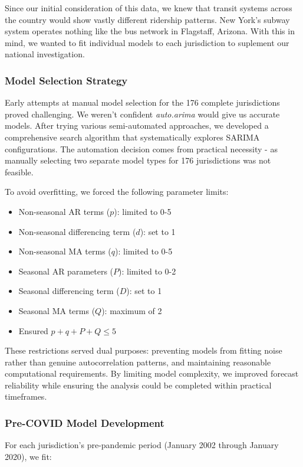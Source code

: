 \documentclass[11pt]{article}
\begin{document}
    Since our initial consideration of this data, we knew that transit systems across the country would show vastly different ridership patterns. New York's subway system operates nothing like the bus network in Flagstaff, Arizona. With this in mind, we wanted to fit individual models to each jurisdiction to suplement our national investigation.

\subsubsection{Model Selection Strategy}

    Early attempts at manual model selection for the 176 complete jurisdictions proved challenging. We weren't confident \textit{auto.arima} would give us accurate models. After trying various semi-automated approaches, we developed a comprehensive search algorithm that systematically explores SARIMA configurations. The automation decision comes from practical necessity - as manually selecting two separate model types for 176 jurisdictions was not feasible.

    To avoid overfitting, we forced the following parameter limits:
\begin{itemize}
  \item Non-seasonal AR terms ($p$): limited to 0-5
  \item   Non-seasonal differencing term ($d$): set to 1
  \item Non-seasonal MA terms ($q$): limited to 0-5  
  \item Seasonal AR parameters ($P$): limited to 0-2
  \item   Seasonal differencing term ($D$): set to 1
  \item Seasonal MA terms ($Q$): maximum of 2
  \item Ensured $p + q + P + Q \leq 5$
\end{itemize}

    These restrictions served dual purposes: preventing models from fitting noise rather than genuine autocorrelation patterns, and maintaining reasonable computational requirements. By limiting model complexity, we improved forecast reliability while ensuring the analysis could be completed within practical timeframes.

\subsubsection{Pre-COVID Model Development}

For each jurisdiction's pre-pandemic period (January 2002 through January 2020), we fit:
\end{document}
